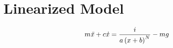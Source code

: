 \chapter{Linearized Model} 

\begin{equation}
m{\it \ddot{x}}+c{\it \dot{x}}={\frac {i}{a \left( x+b \right) ^{N}}}-mg
\end{equation}